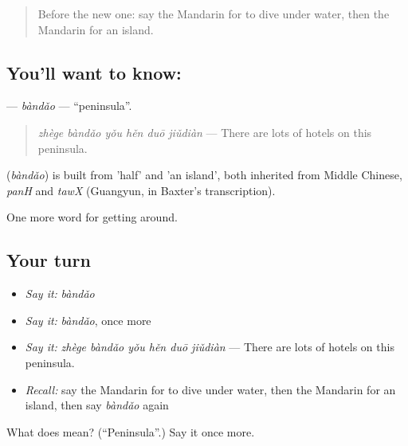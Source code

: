 \label{lesson:ZH-C444-bandao}



\begin{quote}
Before the new one: say the Mandarin for to dive under water, then the Mandarin for an island.
\end{quote}

\subsection*{You'll want to know: }
\textbf{} — \emph{bàndǎo} — \textquotedblleft{}peninsula\textquotedblright{}.

\begin{quote}
\textbf{} \emph{zhège bàndǎo yǒu hěn duō jiǔdiàn} — There are lots of hotels on this peninsula.
\end{quote}

\begin{cousinweb}
\textbf{} (\emph{bàndǎo}) is built from  'half' and  'an island', both inherited from Middle Chinese, \emph{panH} and \emph{tawX} (Guangyun, in Baxter's transcription).
\end{cousinweb}

\begin{grammarlens}[title={What you've built}]
One more word for getting around.
\end{grammarlens}

\subsection*{Your turn}
\begin{itemize}
\raggedright
  \item \emph{Say it:} \emph{bàndǎo}
  \item \emph{Say it:} \emph{bàndǎo}, once more
  \item \emph{Say it:} \emph{zhège bàndǎo yǒu hěn duō jiǔdiàn} — There are lots of hotels on this peninsula.
  \item \emph{Recall:} say the Mandarin for to dive under water, then the Mandarin for an island, then say \emph{bàndǎo} again
\end{itemize}

\begin{tcolorbox}[breakable,colback=teal!4,colframe=teal!35!black,title={Before you move on}]
What does  mean? (\textquotedblleft{}Peninsula\textquotedblright{}.) Say it once more.
\end{tcolorbox}
